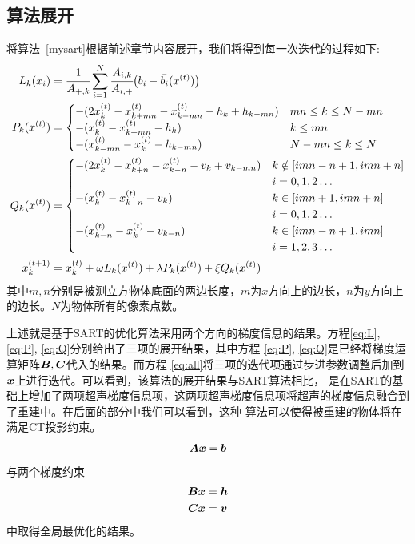 \subsection{算法展开}\label{sec:algodetail}
将算法~\ref{mysart}根据前述章节内容展开，我们将得到每一次迭代的过程如下:
\begin{align}
 L_k(x_i) &= \cfrac{1}{A_{+,k}}\sum^N_{i=1}\cfrac{A_{i,k}}{A_{i,+}}\bigl(b_i-\bar{b_i}(x^{(t)})\bigr) \label{eq:L} \\
P_k(x^{(t)}) &= \begin{cases}
                            -(2x_k^{(t)} - x_{k+mn}^{(t)} - x_{k-mn}^{(t)} - h_k + h_{k-mn}) & mn \le k \le N-mn \\
                            -(x_k^{(t)} - x_{k+mn}^{(t)} - h_k) &  k\le mn \\
                            -(x_{k-mn}^{(t)} - x_{k}^{(t)} - h_{k-mn}) &  N-mn \le k \le N
                        \end{cases}  \label{eq:P} \\
Q_k(x^{(t)}) &= \begin{cases}
                            -(2x_k^{(t)} - x_{k+n}^{(t)} - x_{k-n}^{(t)} - v_k + v_{k-mn}) & k \notin [ imn-n+1, imn+n]
                            \\ &i = 0,1,2\hdots\\
                            -(x_k^{(t)} - x_{k+n}^{(t)} - v_k) & k \in \left[imn+1,imn+n\right] \\ &i = 0,1,2\hdots\\
                            -(x_{k-n}^{(t)} - x_{k}^{(t)} - v_{k-n}) &  k \in [imn-n+1,imn] \\ &i= 1,2,3 \hdots
                        \end{cases} \label{eq:Q} \\
x_k^{(t+1)}&= x_k^{(t)} + \omega L_k(x^{(t)}) + \lambda P_k(x^{(t)}) + \xi Q_k(x^{(t)}) \label{eq:all}
\end{align}
其中$m,n$分别是被测立方物体底面的两边长度，$m$为$x$方向上的边长，$n$为$y$方向上的边长。$N$为物体所有的像素点数。

上述就是基于SART的优化算法采用两个方向的梯度信息的结果。方程\eqref{eq:L}, \eqref{eq:P}, \eqref{eq:Q}分别给出了三项的展开结果，其中方程
\eqref{eq:P}, \eqref{eq:Q}是已经将梯度运算矩阵$\bm{B},\bm{C}$代入的结果。而方程
\eqref{eq:all}将三项的迭代项通过步进参数调整后加到$\bm{ x}$上进行迭代。可以看到，该算法的展开结果与SART算法相比，
是在SART的基础上增加了两项超声梯度信息项，这两项超声梯度信息项将超声的梯度信息融合到了重建中。在后面的部分中我们可以看到，这种
算法可以使得被重建的物体将在满足CT投影约束。
\begin{equation*}
\bm{A}\bm{ x} = \bm{b}
\end{equation*}
与两个梯度约束
\begin{align*}
\bm{B}\bm{ x} &= \bm{h} \\
\bm{C}\bm{ x} &= \bm{v}
\end{align*}
中取得全局最优化的结果。



